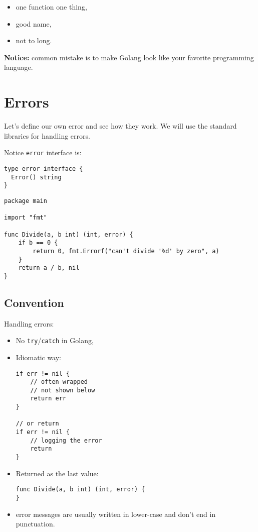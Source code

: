 \documentclass[11pt, letterpaper]{article}
\begin{document}
\begin{itemize}%
\item one function one thing,
\item good name,
\item not to long.
\end{itemize}%

\bigskip
\textbf{Notice:} common mistake is to make Golang look like your favorite programming language.

\section{Errors}
Let's define our own error and see how they work. We will use the standard libraries for handling errors.

Notice \verb|error| interface is:

\begin{verbatim}
type error interface {
  Error() string
}
\end{verbatim}

\begin{verbatim}
package main

import "fmt"

func Divide(a, b int) (int, error) {
    if b == 0 {
        return 0, fmt.Errorf("can't divide '%d' by zero", a)
    }
    return a / b, nil
}
\end{verbatim}

\subsection{Convention}

Handling errors:

\begin{itemize}%
\item No \verb|try|/\verb|catch| in Golang,
\item Idiomatic way: \begin{verbatim}
if err != nil {
	// often wrapped
	// not shown below
	return err
}

// or return
if err != nil {
	// logging the error
	return
}
\end{verbatim}
\item Returned as the last value: \begin{verbatim}
func Divide(a, b int) (int, error) {
}
\end{verbatim}
\item error messages are usually written in lower-case and don’t end in punctuation.
\end{itemize}
\end{document}
